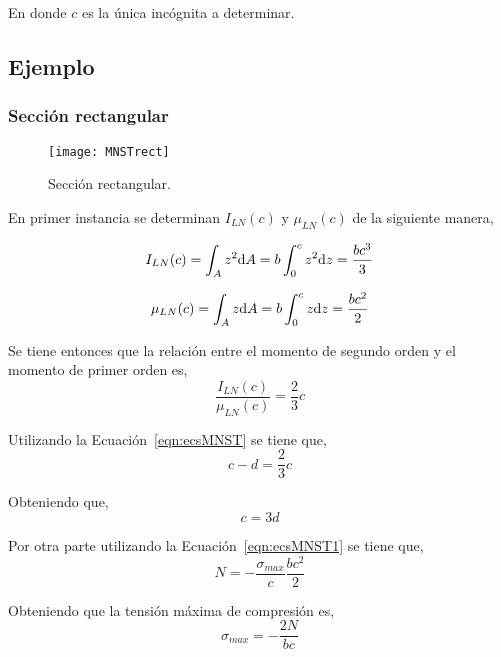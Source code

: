 En donde $c$ es la única incógnita a determinar.

\subsection{Ejemplo}

\subsubsection{Sección rectangular}

\begin{figure}[htb]
	\centering
	\texttt{[image: MNSTrect]}
	\caption{Sección rectangular.}
	\label{fig:MNSTrect}
\end{figure}

En primer instancia se determinan $I_{LN}(c)$ y $\mu_{LN}(c)$ de la siguiente manera,

\begin{equation}
I_{LN}(c) = \int_{A} z^2 {\text{d}} A = b \int_{0}^{c} z^2 {\text{d}} z = \frac{bc^3}{3} \label{eqn:ecsEjr1}
\end{equation}

\begin{equation}
\mu_{LN}(c) = \int_{A} z {\text{d}} A = b \int_{0}^{c} z {\text{d}} z = \frac{bc^2}{2} \label{eqn:ecsEjr2}
\end{equation}

Se tiene entonces que la relación entre el momento de segundo orden y el momento de primer orden es,
\begin{equation}
\frac{I_{LN}(c)}{\mu_{LN}(c)} = \frac{2}{3}c
\end{equation}

Utilizando la Ecuación~\eqref{eqn:ecsMNST} se tiene que,
\begin{equation}
c-d = \frac{2}{3}c
\end{equation}

Obteniendo que,
\begin{equation}
c = 3d
\end{equation}

Por otra parte utilizando la Ecuación~\eqref{eqn:ecsMNST1} se tiene que,
\begin{equation}
N = -\frac{\sigma_{max}}{c} \frac{bc^2}{2}
\end{equation}

Obteniendo que la tensión máxima de compresión es,
\begin{equation}
\boxed{
\sigma_{max} = -\frac{2N}{bc}
}
\end{equation}





